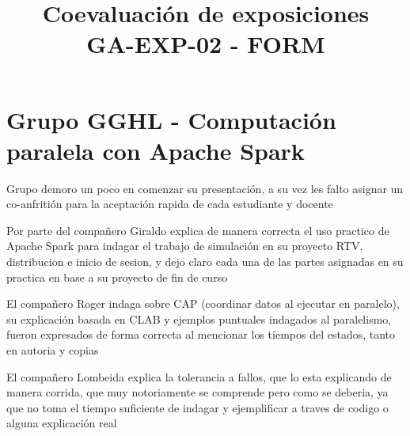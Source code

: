 \documentclass[conference,onecolumn,a4paper]{IEEEtran}
\title{Coevaluación de exposiciones\\\large GA-EXP-02 - FORM}
\author{\IEEEauthorblockN{Byron Daniel Loor Mendoza}
\IEEEauthorblockA{ISR-701 - Aplicaciones Distribuidas\\SPA 2026-2027\\26 de noviembre de 2026}}
\begin{document}
\maketitle

\section{Grupo GGHL - Computación paralela con Apache Spark}
Grupo demoro un poco en comenzar su presentación, a su vez les falto asignar un co-anfritión para la aceptación rapida de cada estudiante y docente

Por parte del compañero Giraldo explica de manera correcta el uso practico de Apache Spark para indagar el trabajo de simulación en su proyecto RTV, distribucion e inicio de sesion, y dejo claro cada una de las partes asignadas en su practica en base a su proyecto de fin de curso


El compañero Roger indaga sobre CAP (coordinar datos al ejecutar en paralelo), su explicación basada en CLAB y ejemplos puntuales indagados al paralelismo, fueron expresados de forma correcta al mencionar los tiempos del estados, tanto en autoria y copias

El compañero Lombeida explica la tolerancia a fallos, que lo esta explicando de manera corrida, que muy notoriamente se comprende pero como se deberia, ya que no toma el tiempo suficiente de indagar y ejemplificar a traves de codigo o alguna explicación real
\end{document}
